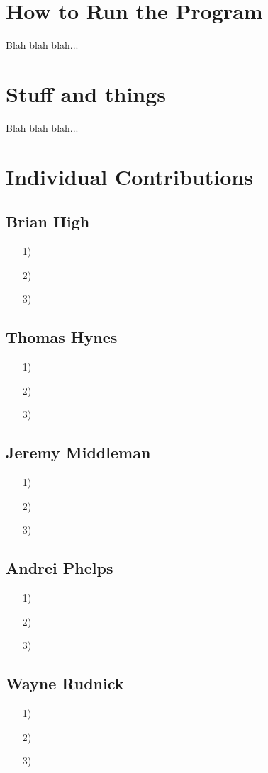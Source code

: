 \documentclass{article}
\begin{document}
\newpage

\section{How to Run the Program}
Blah blah blah...

\section{Stuff and things}
Blah blah blah...

\section{Individual Contributions}

\subsection{Brian High}
\begin{itemize}
    \item[1)] 
    \item[2)] 
    \item[3)] 
\end{itemize}

\subsection{Thomas Hynes}
\begin{itemize}
    \item[1)] 
    \item[2)] 
    \item[3)] 
\end{itemize}

\subsection{Jeremy Middleman}
\begin{itemize}
    \item[1)] 
    \item[2)] 
    \item[3)] 
\end{itemize}

\subsection{Andrei Phelps}
\begin{itemize}
    \item[1)] 
    \item[2)] 
    \item[3)] 
\end{itemize}

\subsection{Wayne Rudnick}
\begin{itemize}
    \item[1)] 
    \item[2)] 
    \item[3)] 
\end{itemize}
\end{document}
